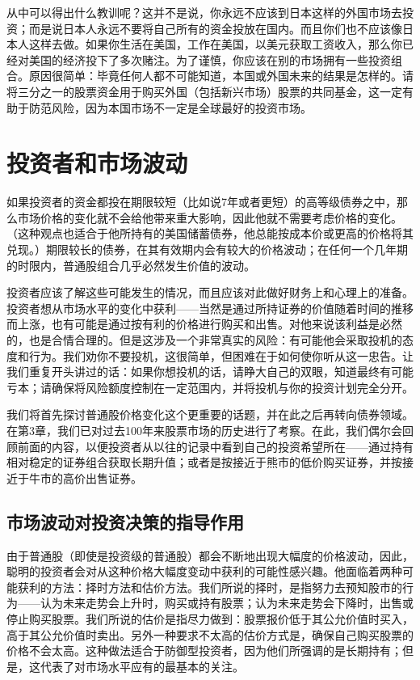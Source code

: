 \documentclass[12pt,oneside]{book}
\begin{document}
从中可以得出什么教训呢？这并不是说，你永远不应该到日本这样的外国市场去投资；而是说日本人永远不要将自己所有的资金投放在国内。而且你们也不应该像日本人这样去做。如果你生活在美国，工作在美国，以美元获取工资收入，那么你已经对美国的经济投下了多次赌注。为了谨慎，你应该在别的市场拥有一些投资组合。原因很简单：毕竟任何人都不可能知道，本国或外国未来的结果是怎样的。请将三分之一的股票资金用于购买外国（包括新兴市场）股票的共同基金，这一定有助于防范风险，因为本国市场不一定是全球最好的投资市场。


\section{投资者和市场波动}
如果投资者的资金都投在期限较短（比如说7年或者更短）的高等级债券之中，那么市场价格的变化就不会给他带来重大影响，因此他就不需要考虑价格的变化。（这种观点也适合于他所持有的美国储蓄债券，他总能按成本价或更高的价格将其兑现。）期限较长的债券，在其有效期内会有较大的价格波动；在任何一个几年期的时限内，普通股组合几乎必然发生价值的波动。

投资者应该了解这些可能发生的情况，而且应该对此做好财务上和心理上的准备。投资者想从市场水平的变化中获利——当然是通过所持证券的价值随着时间的推移而上涨，也有可能是通过按有利的价格进行购买和出售。对他来说该利益是必然的，也是合情合理的。但是这涉及一个非常真实的风险：有可能他会采取投机的态度和行为。我们劝你不要投机，这很简单，但困难在于如何使你听从这一忠告。让我们重复开头讲过的话：如果你想投机的话，请睁大自己的双眼，知道最终有可能亏本；请确保将风险额度控制在一定范围内，并将投机与你的投资计划完全分开。

我们将首先探讨普通股价格变化这个更重要的话题，并在此之后再转向债券领域。在第3章，我们已对过去100年来股票市场的历史进行了考察。在此，我们偶尔会回顾前面的内容，以便投资者从以往的记录中看到自己的投资希望所在——通过持有相对稳定的证券组合获取长期升值；或者是按接近于熊市的低价购买证券，并按接近于牛市的高价出售证券。

\subsection{市场波动对投资决策的指导作用}
由于普通股（即使是投资级的普通股）都会不断地出现大幅度的价格波动，因此，聪明的投资者会对从这种价格大幅度变动中获利的可能性感兴趣。他面临着两种可能获利的方法：择时方法和估价方法。我们所说的择时，是指努力去预知股市的行为——认为未来走势会上升时，购买或持有股票；认为未来走势会下降时，出售或停止购买股票。我们所说的估价是指尽力做到：股票报价低于其公允价值时买入，高于其公允价值时卖出。另外一种要求不太高的估价方式是，确保自己购买股票的价格不会太高。这种做法适合于防御型投资者，因为他们所强调的是长期持有；但是，这代表了对市场水平应有的最基本的关注。
\end{document}
